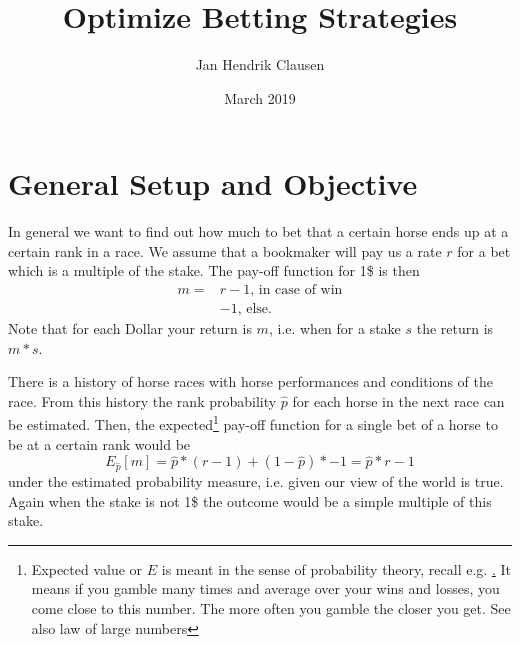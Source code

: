 \documentclass{article}
\title{Optimize Betting Strategies}
\author{Jan Hendrik Clausen}
\date{March 2019}
\begin{document}
\maketitle

\section{General Setup and Objective}
In general we want to find out how much to bet that a certain horse ends up at a certain rank in a race. 
We assume that a bookmaker will pay us a rate $r$ for a bet which is a multiple of the stake. The pay-off function for 1\$ is then
\begin{align*}
  m = & r-1 \text{, in case of win} \\
      & -1 \text{, else.}
\end{align*}
Note that for each Dollar your return is $m$, i.e. when for a stake $s$ the return is $m*s$.


There is a history of horse races with horse performances and conditions of the race. From this history the rank probability $\hat p$ for each horse in the next race can be estimated. Then, the expected\footnote{Expected value or $E$ is meant in the sense of probability theory, recall e.g. \href{https://en.wikipedia.org/wiki/Expected\_value}. It means if you gamble many times and average over your wins and losses, you come close to this number. The more often you gamble the closer you get. See also law of large numbers } pay-off function for a single bet of a horse to be at a certain rank would be
\begin{equation}\label{eq:expectation}
 E_{\hat p}[m] = \hat p * (r-1) + (1- \hat p) * -1 = \hat p *r -1
\end{equation}
under the estimated probability measure, i.e. given our view of the world is true. Again when the stake is not 1\$ the outcome would be a simple multiple of this stake.
\end{document}

